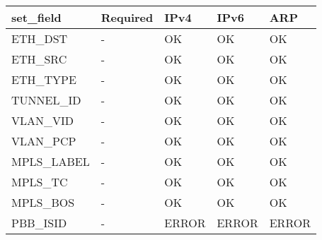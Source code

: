 \begin{table}[H]
\begin{tabular}{|l|l|l|l|l|}
\hline
\textbf{set\_field} & Required & IPv4  & IPv6  & ARP   \\ \hline
ETH\_DST            & -        & OK    & OK    & OK    \\ \hline
ETH\_SRC            & -        & OK    & OK    & OK    \\ \hline
ETH\_TYPE           & -        & OK    & OK    & OK    \\ \hline
TUNNEL\_ID          & -        & OK    & OK    & OK    \\ \hline
VLAN\_VID           & -        & OK    & OK    & OK    \\ \hline
VLAN\_PCP           & -        & OK    & OK    & OK    \\ \hline
MPLS\_LABEL         & -        & OK    & OK    & OK    \\ \hline
MPLS\_TC            & -        & OK    & OK    & OK    \\ \hline
MPLS\_BOS           & -        & OK    & OK    & OK    \\ \hline
PBB\_ISID           & -        & ERROR & ERROR & ERROR \\ \hline
\end{tabular}
\end{table}

